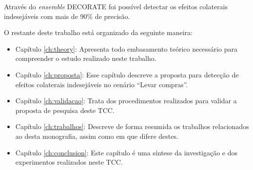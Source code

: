 Através do \textit{ensemble} DECORATE foi possível detectar os efeitos colaterais indesejáveis com mais de 90\% de precisão. 

O restante deste trabalho está organizado da seguinte maneira:

\begin{itemize}
\item Capítulo \ref{ch:theory}: Apresenta todo embasamento teórico necessário para compreender o estudo realizado neste trabalho.
\item Capítulo \ref{ch:proposta}: Esse capítulo descreve a proposta para detecção de efeitos colaterais indesejáveis no cenário ``Levar compras''.
\item Capítulo \ref{ch:validacao}: Trata dos procedimentos realizados para validar a proposta de pesquisa deste TCC.
\item Capítulo \ref{ch:trabalhos}: Descreve de forma resumida os trabalhos relacionados ao desta monografia, assim como em que difere destes.
\item Capítulo \ref{ch:conclusion}: Este capítulo é uma síntese da investigação e dos experimentos realizados neste TCC.
\end{itemize}
